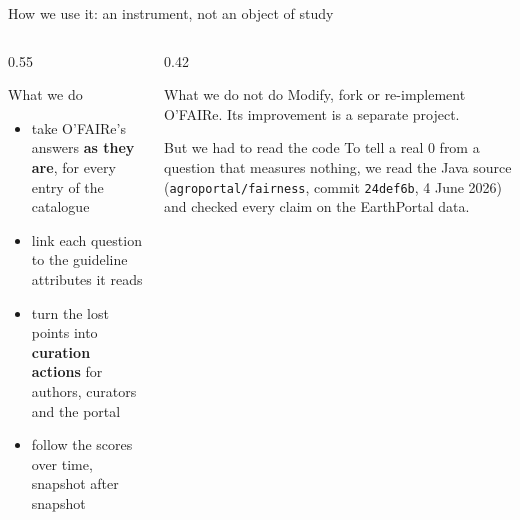 \documentclass[aspectratio=169,10pt]{beamer}
\newcommand{\code}[1]{{\color{dtblue}\texttt{#1}}}
\begin{document}
\begin{frame}{How we use it: an instrument, not an object of study}
  \begin{columns}[c]
    \begin{column}{0.55\textwidth}
      \begin{exampleblock}{What we do}
        \begin{itemize}
          \item take O'FAIRe's answers \textbf{as they are}, for every entry of the catalogue
          \item link each question to the guideline attributes it reads
          \item turn the lost points into \textbf{curation actions} for authors, curators and the portal
          \item follow the scores over time, snapshot after snapshot
        \end{itemize}
      \end{exampleblock}
    \end{column}
    \begin{column}{0.42\textwidth}
      \begin{alertblock}{What we do not do}
        Modify, fork or re-implement O'FAIRe. Its improvement is a separate project.
      \end{alertblock}
      \vspace{4pt}
      \begin{block}{But we had to read the code}
        {\small To tell a real 0 from a question that measures nothing, we read the Java source
        (\code{agroportal/fairness}, commit \code{24def6b}, 4 June 2026) and checked every claim on
        the EarthPortal data.}
      \end{block}
    \end{column}
  \end{columns}
\end{frame}
\end{document}
